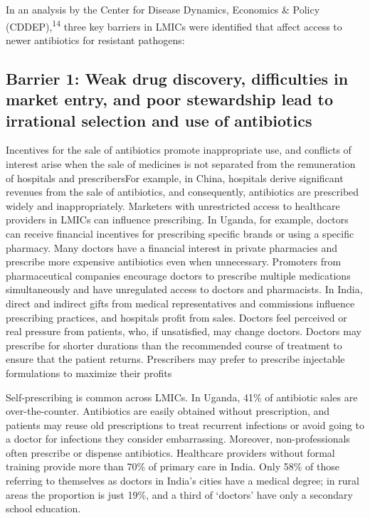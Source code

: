 \documentclass[
]{book}
\begin{document}
In an analysis by the Center for Disease Dynamics, Economics \& Policy (CDDEP),\textsuperscript{14} three key barriers in LMICs were identified that affect access to newer antibiotics for resistant pathogens:

\hypertarget{barrier-1-weak-drug-discovery-difficulties-in-market-entry-and-poor-stewardship-lead-to-irrational-selection-and-use-of-antibiotics}{%
\subsection*{Barrier 1: Weak drug discovery, difficulties in market entry, and poor stewardship lead to irrational selection and use of antibiotics}\label{barrier-1-weak-drug-discovery-difficulties-in-market-entry-and-poor-stewardship-lead-to-irrational-selection-and-use-of-antibiotics}}

Incentives for the sale of antibiotics promote inappropriate use, and conflicts of interest arise when the sale of medicines is not separated from the remuneration of hospitals and prescribersFor example, in China, hospitals derive significant revenues from the sale of antibiotics, and consequently, antibiotics are prescribed widely and inappropriately. Marketers with unrestricted access to healthcare providers in LMICs can influence prescribing. In Uganda, for example, doctors can receive financial incentives for prescribing specific brands or using a specific pharmacy. Many doctors have a financial interest in private pharmacies and prescribe more expensive antibiotics even when unnecessary. Promoters from pharmaceutical companies encourage doctors to prescribe multiple medications simultaneously and have unregulated access to doctors and pharmacists. In India, direct and indirect gifts from medical representatives and commissions influence prescribing practices, and hospitals profit from sales. Doctors feel perceived or real pressure from patients, who, if unsatisfied, may change doctors. Doctors may prescribe for shorter durations than the recommended course of treatment to ensure that the patient returns. Prescribers may prefer to prescribe injectable formulations to maximize their profits

Self-prescribing is common across LMICs. In Uganda, 41\% of antibiotic sales are over-the-counter. Antibiotics are easily obtained without prescription, and patients may reuse old prescriptions to treat recurrent infections or avoid going to a doctor for infections they consider embarrassing. Moreover, non-professionals often prescribe or dispense antibiotics. Healthcare providers without formal training provide more than 70\% of primary care in India. Only 58\% of those referring to themselves as doctors in India's cities have a medical degree; in rural areas the proportion is just 19\%, and a third of `doctors' have only a secondary school education.
\end{document}
